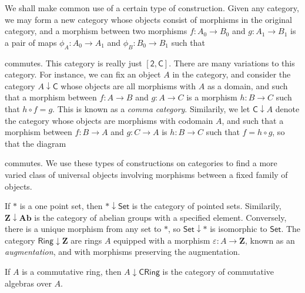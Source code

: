 We shall make common use of a certain type of construction. Given any category, we may form a new category whose objects consist of morphisms in the original category, and a morphism between two morphisms $f: A_0 \to B_0$ and $g: A_1 \to B_1$ is a pair of maps $\phi_A: A_0 \to A_1$ and $\phi_B: B_0 \to B_1$ such that
%
\begin{center}
\end{center}
%
commutes. This category is really just $[\mathsf{2},\mathsf{C}]$. There are many variations to this category. For instance, we can fix an object $A$ in the category, and consider the category $A \downarrow \mathsf{C}$ whose objects are all morphisms with $A$ as a domain, and such that a morphism between $f: A \to B$ and $g: A \to C$ is a morphism $h: B \to C$ such that $h \circ f = g$. This is known as a \emph{comma category}. Similarily, we let $\mathsf{C} \downarrow A$ denote the category whose objects are morphisms with codomain $A$, and such that a morphism between $f: B \to A$ and $g: C \to A$ is $h: B \to C$ such that $f = h \circ g$, so that the diagram
%
\begin{center}
\end{center}
%
commutes. We use these types of constructions on categories to find a more varied class of universal objects involving morphisms between a fixed family of objects.

\begin{example}
    If $*$ is a one point set, then $* \downarrow \mathsf{Set}$ is the category of pointed sets. Similarily, $\mathbf{Z} \downarrow \mathbf{Ab}$ is the category of abelian groups with a specified element. Conversely, there is a unique morphism from any set to $*$, so $\mathsf{Set} \downarrow *$ is isomorphic to $\mathsf{Set}$. The category $\mathsf{Ring} \downarrow \mathbf{Z}$ are rings $A$ equipped with a morphism $\varepsilon: A \to \mathbf{Z}$, known as an {\it augmentation}, and with morphisms preserving the augmentation.
\end{example}

\begin{example}
    If $A$ is a commutative ring, then $A \downarrow \mathsf{CRing}$ is the category of commutative algebras over $A$.
\end{example}

